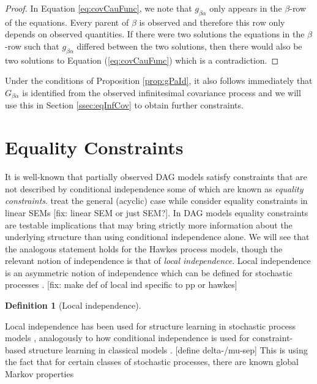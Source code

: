 \documentclass[accepted]{uai2021} %
\newtheorem{defn}[thm]{Definition}
\begin{document}
\begin{proof}
	In Equation \ref{eq:covCauFunc}, we note that $g_{\beta\alpha}$ only 
	appears in the $\beta$-row of the equations. Every parent of $\beta$ is 
	observed and therefore this row only depends on observed quantities. If 
	there were two solutions the equations in the $\beta$-row such that 
	$g_{\beta\alpha}$ differed between the two solutions, then there would also 
	be two solutions to Equation (\ref{eq:covCauFunc}) which is a contradiction.
\end{proof}

Under the conditions of Proposition \ref{prop:gPaId}, it also follows 
immediately that $G_{\beta\alpha}$ is identified from the observed 
infinitesimal covariance process and we will use this in Section 
\ref{ssec:eqInfCov} to obtain further constraints.


\section{Equality Constraints}


It is well-known that partially observed DAG models satisfy 
constraints that 
are not described by conditional independence some of which are known as 
\emph{equality constraints}. \cite{richardson2017} treat the general (acyclic) 
case 
while \cite{chen2014, chenNIPS2016} consider equality constraints in linear 
SEMs [fix: linear SEM or 
just 
SEM?]. In DAG models equality constraints are testable implications that may 
bring strictly more information about the underlying structure than using 
conditional independence alone. We will see that the analogous statement holds 
for the Hawkes process models, though the relevant notion of independence is 
that of \emph{local independence}. Local independence is an asymmetric notion 
of independence which can be defined 
for stochastic processes \citep{schweder1970, aalen1987, didelez2000, 
didelez2008}. [fix: make def of local ind specific to pp or hawkes]

\begin{defn}[Local independence]
	\label{def:li}
\end{defn}

Local independence has been used for structure learning in stochastic process 
models 
\citep{meek2014, mogensenUAI2018, thams2019, mogensenUAI2020}, analogously to 
how conditional independence is used for 
constraint-based structure learning in classical models \citep{spirtes1993, 
spirtesSearchChapHandbook}. 
[define 
delta-/mu-sep] This is using the fact that for certain classes of stochastic 
processes, there are known global Markov properties
\end{document}
